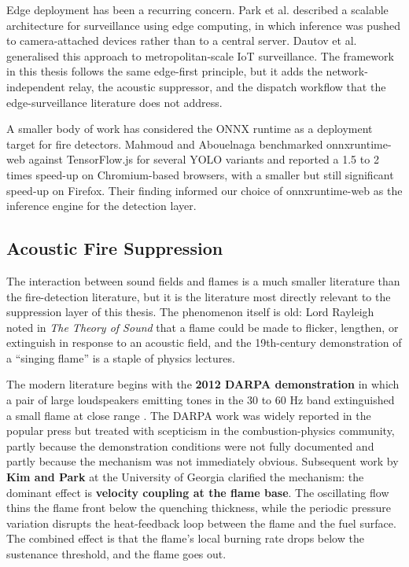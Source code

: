 Edge deployment has been a recurring concern. Park et al. \cite{park2017scalable} described a scalable architecture for surveillance using edge computing, in which inference was pushed to camera-attached devices rather than to a central server. Dautov et al. \cite{dautov2018metropolitan} generalised this approach to metropolitan-scale IoT surveillance. The framework in this thesis follows the same edge-first principle, but it adds the network-independent relay, the acoustic suppressor, and the dispatch workflow that the edge-surveillance literature does not address.

A smaller body of work has considered the ONNX runtime as a deployment target for fire detectors. Mahmoud and Abouelnaga \cite{mahmoud2023onnx} benchmarked onnxruntime-web against TensorFlow.js for several YOLO variants and reported a 1.5 to 2 times speed-up on Chromium-based browsers, with a smaller but still significant speed-up on Firefox. Their finding informed our choice of onnxruntime-web as the inference engine for the detection layer.

\subsection{Acoustic Fire Suppression}

The interaction between sound fields and flames is a much smaller literature than the fire-detection literature, but it is the literature most directly relevant to the suppression layer of this thesis. The phenomenon itself is old: Lord Rayleigh noted in \textit{The Theory of Sound} that a flame could be made to flicker, lengthen, or extinguish in response to an acoustic field, and the 19th-century demonstration of a ``singing flame'' is a staple of physics lectures.

The modern literature begins with the \textbf{2012 DARPA demonstration} in which a pair of large loudspeakers emitting tones in the 30 to 60 Hz band extinguished a small flame at close range \cite{darpa2012acoustic}. The DARPA work was widely reported in the popular press but treated with scepticism in the combustion-physics community, partly because the demonstration conditions were not fully documented and partly because the mechanism was not immediately obvious. Subsequent work by \textbf{Kim and Park} \cite{kim2015acoustic} at the University of Georgia clarified the mechanism: the dominant effect is \textbf{velocity coupling at the flame base}. The oscillating flow thins the flame front below the quenching thickness, while the periodic pressure variation disrupts the heat-feedback loop between the flame and the fuel surface. The combined effect is that the flame's local burning rate drops below the sustenance threshold, and the flame goes out.

